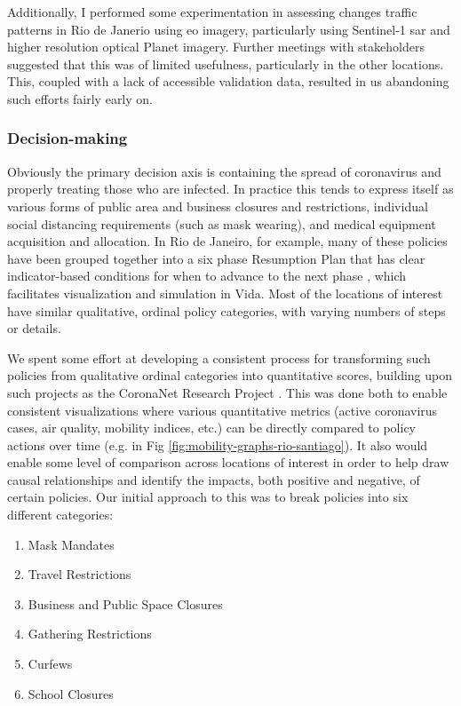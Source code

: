 Additionally, I performed some experimentation in assessing changes traffic patterns in Rio de Janerio using \ac{eo} imagery, particularly using Sentinel-1 \ac{sar} and higher resolution optical Planet imagery. Further meetings with stakeholders suggested that this was of limited usefulness, particularly in the other locations. This, coupled with a lack of accessible validation data, resulted in us abandoning such efforts fairly early on.

\subsubsection{Decision-making} \label{sec:vida-evdt-decision-method}

Obviously the primary decision axis is containing the spread of coronavirus and properly treating those who are infected. In practice this tends to express itself as various forms of public area and business closures and restrictions, individual social distancing requirements (such as mask wearing), and medical equipment acquisition and allocation. In Rio de Janeiro, for example, many of these policies have been grouped together into a six phase Resumption Plan that has clear indicator-based conditions for when to advance to the next phase \cite{iplanrioIndicadoresPlanoRetomada2020}, which facilitates visualization and simulation in Vida. Most of the locations of interest have similar qualitative, ordinal policy categories, with varying numbers of steps or details. 

We spent some effort at developing a consistent process for transforming such policies from qualitative ordinal categories into quantitative scores, building upon such projects as the CoronaNet Research Project \cite{CoronaNetResearchProject}. This was done both to enable consistent visualizations where various quantitative metrics (active coronavirus cases, air quality, mobility indices, etc.) can be directly compared to policy actions over time (e.g. in Fig \ref{fig:mobility-graphs-rio-santiago}). It also would enable some level of comparison across locations of interest in order to help draw causal relationships and identify the impacts, both positive and negative, of certain policies. Our initial approach to this was to break policies into six different categories:

\begin{enumerate}[itemsep=0pt,parsep=0pt]
\item{Mask Mandates}
\item{Travel Restrictions}
\item{Business and Public Space Closures}
\item{Gathering Restrictions}
\item{Curfews}
\item{School Closures}
\end{enumerate}

